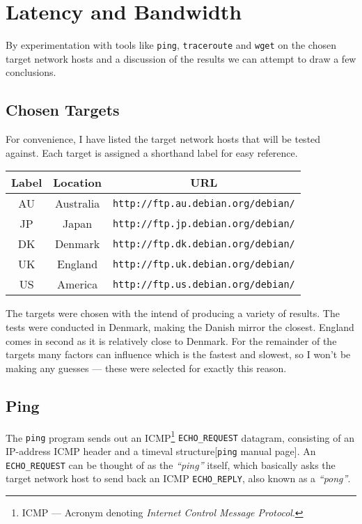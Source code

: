 \documentclass[prodmode,acmtoit]{acmsmall}
\newcommand{\code}[1]{{\tt #1}}
\newcommand{\prog}[1]{{\tt #1}}
\begin{document}
\section{Latency and Bandwidth}
\label{sec:latency-and-bandwidth}
By experimentation with tools like \prog{ping}, \prog{traceroute} and
\prog{wget} on the chosen target network hosts and a discussion of the
results we can attempt to draw a few conclusions.

\subsection{Chosen Targets}
\label{sec:latency-and-bandwidth|sub:chosen-targets}
For convenience, I have listed the target network hosts that will be tested
against. Each target is assigned a shorthand label for easy reference.
\begin{center}
    \begin{tabular}{|c|c|c|}
        \hline
        {\bf Label}     & {\bf Location}    & {\bf URL} \\ \hline
        AU  & Australia & {\tt http://ftp.au.debian.org/debian/} \\ \hline
        JP  & Japan     & {\tt http://ftp.jp.debian.org/debian/} \\ \hline
        DK  & Denmark   & {\tt http://ftp.dk.debian.org/debian/} \\ \hline
        UK  & England   & {\tt http://ftp.uk.debian.org/debian/} \\ \hline
        US  & America   & {\tt http://ftp.us.debian.org/debian/} \\ \hline
    \end{tabular}
\end{center}
The targets were chosen with the intend of producing a variety of results. The
tests were conducted in Denmark, making the Danish mirror the closest. England
comes in second as it is relatively close to Denmark. For the remainder of the
targets many factors can influence which is the fastest and slowest, so I
won't be making any guesses --- these were selected for exactly this reason.

\subsection{Ping}
The \prog{ping} program sends out an ICMP\footnote{ICMP --- Acronym denoting
{\it Internet Control Message Protocol}.} \code{ECHO\_REQUEST} datagram,
consisting of an IP-address  ICMP header and a timeval structure[\prog{ping}
manual page]. An \code{ECHO\_REQUEST} can be thought of as the {\it ``ping''}
itself, which basically asks the target network host to send back an ICMP
\code{ECHO\_REPLY}, also known as a {\it ``pong''}.
\end{document}
